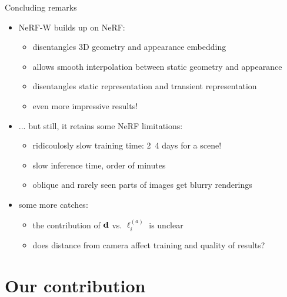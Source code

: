 \documentclass[aspectratio=1610]{beamer}
\begin{document}
\begin{frame}{Concluding remarks}
    \begin{itemize}
        \item NeRF-W builds up on NeRF:
        \begin{itemize}
            \item disentangles 3D geometry and appearance embedding
            \item allows smooth interpolation between static geometry and appearance
            \item disentangles static representation and transient representation
            \item even more impressive results!
        \end{itemize}
        \pause
        \item ... but still, it retains some NeRF limitations:
        \begin{itemize}
            \item ridicoulosly slow training time: 2~4 days for a scene!
            \item slow inference time, order of minutes
            \item oblique and rarely seen parts of images get blurry renderings
        \end{itemize}
        \pause
        \item some more catches:
        \begin{itemize}
            \item the contribution of \(\vb{d}\) vs. \(\ell_i^{(a)}\) is unclear
            \item does distance from camera affect training and quality of results?
        \end{itemize}
    \end{itemize}
\end{frame}

\section{Our contribution}
\end{document}
